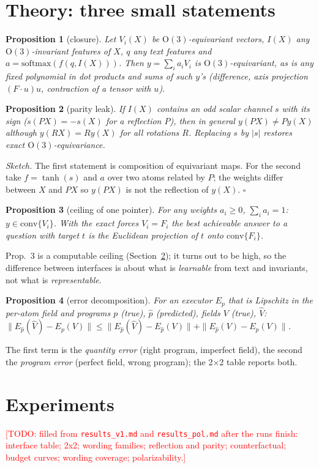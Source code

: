 \documentclass[10pt]{article}
\newtheorem{proposition}{Proposition}
\newcommand{\TODO}[1]{\textcolor{red}{[TODO: #1]}}
\begin{document}
\section{Theory: three small statements}\label{sec:theory}
\begin{proposition}[closure]
Let $V_i(X)$ be $\mathrm{O}(3)$-equivariant vectors, $I(X)$ any $\mathrm{O}(3)$-invariant features of $X$, $q$ any text features and
$a=\mathrm{softmax}(f(q,I(X)))$. Then $y=\sum_ia_iV_i$ is $\mathrm{O}(3)$-equivariant, as is any fixed polynomial in dot products and
sums of such $y$'s (difference, axis projection $(F\cdot u)u$, contraction of a tensor with $u$).
\end{proposition}
\begin{proposition}[parity leak]
If $I(X)$ contains an odd scalar channel $s$ with its sign ($s(PX)=-s(X)$ for a reflection $P$), then in general
$y(PX)\neq Py(X)$ although $y(RX)=Ry(X)$ for all rotations $R$. Replacing $s$ by $|s|$ restores exact $\mathrm{O}(3)$-equivariance.
\end{proposition}
\emph{Sketch.} The first statement is composition of equivariant maps. For the second take $f=\tanh(s)$ and $a$ over two atoms
related by $P$; the weights differ between $X$ and $PX$ so $y(PX)$ is not the reflection of $y(X)$. \hfill$\square$
\begin{proposition}[ceiling of one pointer]
For any weights $a_i\ge0$, $\sum_ia_i=1$: $y\in\mathrm{conv}\{V_i\}$. With the exact forces $V_i=F_i$ the best achievable answer to a
question with target $t$ is the Euclidean projection of $t$ onto $\mathrm{conv}\{F_i\}$.
\end{proposition}
Prop.~3 is a computable ceiling (Section~\ref{sec:exp}); it turns out to be high, so the difference between interfaces is about what is
\emph{learnable} from text and invariants, not what is \emph{representable}.
\begin{proposition}[error decomposition]
For an executor $E_p$ that is Lipschitz in the per-atom field and programs $p$ (true), $\hat p$ (predicted), fields $V$ (true), $\hat V$:
$\|E_{\hat p}(\hat V)-E_p(V)\|\le\|E_{\hat p}(\hat V)-E_{\hat p}(V)\|+\|E_{\hat p}(V)-E_p(V)\|$.
\end{proposition}
The first term is the \emph{quantity error} (right program, imperfect field), the second the \emph{program error} (perfect field,
wrong program); the 2$\times$2 table reports both.

\section{Experiments}\label{sec:exp}
\TODO{filled from \texttt{results\_v1.md} and \texttt{results\_pol.md} after the runs finish: interface table; 2x2; wording families; reflection and parity; counterfactual; budget curves; wording coverage; polarizability.}
\end{document}
